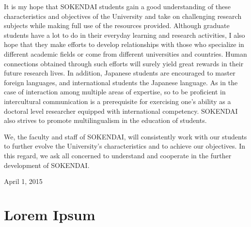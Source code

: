 It is my hope that SOKENDAI students gain a good understanding of these characteristics and objectives of the University and take on challenging research subjects while making full use of the resources provided. Although graduate students have a lot to do in their everyday learning and research activities, I also hope that they make efforts to develop relationships with those who specialize in different academic fields or come from different universities and countries. Human connections obtained through such efforts will surely yield great rewards in their future research lives. In addition, Japanese students are encouraged to master foreign languages, and international students the Japanese language. As in the case of interaction among multiple areas of expertise, so to be proficient in intercultural communication is a prerequisite for exercising one's ability as a doctoral level researcher equipped with international competency. SOKENDAI also strives to promote multilingualism in the education of students.

We, the faculty and staff of SOKENDAI, will consistently work with our students to further evolve the University's characteristics and to achieve our objectives. In this regard, we ask all concerned to understand and cooperate in the further development of SOKENDAI.

April 1, 2015

\section{Lorem Ipsum}



%
%
%
%
\blindmathpaper
%

